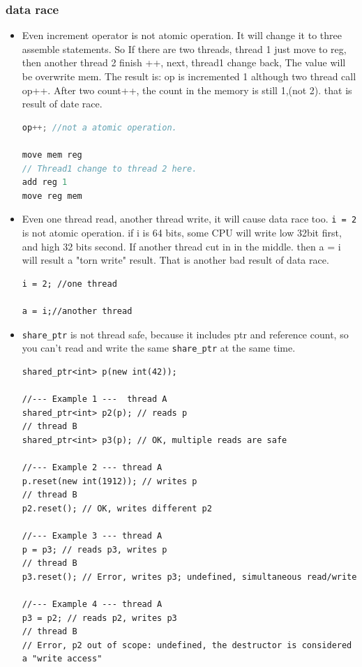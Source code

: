 \documentclass[a4paper,11pt,twoside]{book}
\begin{document}
\subsubsection{data race}
\begin{itemize}

	\item Even increment operator is not atomic operation. It will change it to three assemble statements. So If there are two threads, thread 1 just move to reg, then another thread 2 finish ++, next, thread1 change back, The value will be overwrite mem. The result is: op is incremented 1 although two thread call op++.  After two count++, the count in the memory is still 1,(not 2). that is result of date race.
\begin{lstlisting}[frame=single, language=c++]
op++; //not a atomic operation.

move mem reg
// Thread1 change to thread 2 here. 
add reg 1
move reg mem
\end{lstlisting}		

    \item Even one thread read, another thread write, it will cause data race too.  \texttt{i = 2} is not atomic operation. if i is 64 bits, some CPU will write low 32bit first, and high 32 bits second. If another thread cut in in the middle. then a = i will result a "torn write" result. That is another bad result of data race.
\begin{lstlisting}[]
i = 2; //one thread 

a = i;//another thread
\end{lstlisting}

    \item \texttt{share\_ptr} is not thread safe, because it includes ptr and reference count, so you can't read and write the same \texttt{share\_ptr} at the same time. 

\begin{lstlisting}
shared_ptr<int> p(new int(42));

//--- Example 1 ---  thread A
shared_ptr<int> p2(p); // reads p
// thread B
shared_ptr<int> p3(p); // OK, multiple reads are safe

//--- Example 2 --- thread A
p.reset(new int(1912)); // writes p
// thread B
p2.reset(); // OK, writes different p2

//--- Example 3 --- thread A
p = p3; // reads p3, writes p
// thread B
p3.reset(); // Error, writes p3; undefined, simultaneous read/write

//--- Example 4 --- thread A
p3 = p2; // reads p2, writes p3
// thread B
// Error, p2 out of scope: undefined, the destructor is considered a "write access"


\end{lstlisting}
\end{itemize}
\end{document}
